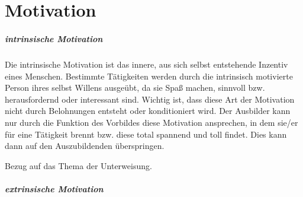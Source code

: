 \chapter{Motivation}

\paragraph{intrinsische Motivation}
Die intrinsische Motivation ist das innere, aus sich selbst entstehende Inzentiv eines Menschen. Bestimmte Tätigkeiten werden durch die intrinsisch motivierte Person ihres selbst Willens ausgeübt, da sie Spaß machen, sinnvoll bzw. herausfordernd oder interessant sind. Wichtig ist, dass diese Art der Motivation nicht durch Belohnungen entsteht oder konditioniert wird. Der Ausbilder kann nur durch die Funktion des Vorbildes diese Motivation ansprechen, in dem sie/er für eine Tätigkeit brennt bzw. diese total spannend und toll findet. Dies kann dann auf den Auszubildenden überspringen. 
\par
Bezug auf das Thema der Unterweisung.
\paragraph{extrinsische Motivation}